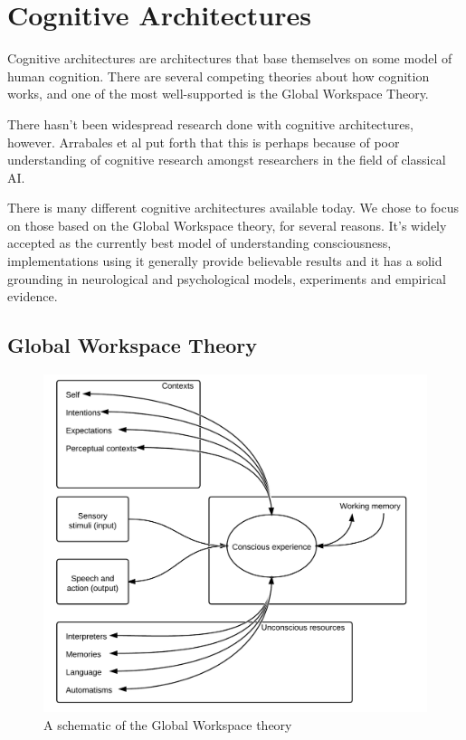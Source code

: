 \section{Cognitive Architectures}
\label{sec:cogarch}
Cognitive architectures are architectures that base themselves on some model of human cognition. There are several competing theories about how cognition works, and one of the most well-supported is the Global Workspace Theory.

There hasn't been widespread research done with cognitive architectures, however. Arrabales et al put forth that this is perhaps because of poor understanding of cognitive research amongst researchers in the field of classical AI. \cite{arrabales2009gamechars}

There is many different cognitive architectures available today\cite{duch2008cognitive}. We chose to focus on those based on the Global Workspace theory, for several reasons. It's widely accepted as the currently best model of understanding consciousness\cite{Franklin2012}, implementations using it generally provide believable results\cite{arrabales2009gamechars}\cite{snaider2011lida} and it has a solid grounding in neurological and psychological models, experiments and empirical evidence\cite{Franklin2012}.

\subsection{Global Workspace Theory}
\begin{figure}[h!tb]
\centering
\includegraphics[scale=1.0]{graphics/globalworkspace.png}
\caption{A schematic of the Global Workspace theory\cite{baars2005gwt}}
\label{fig:gwt}
\end{figure}

